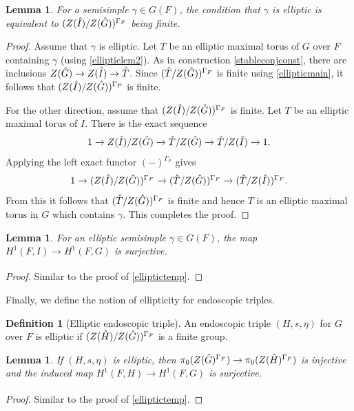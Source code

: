 \documentclass[11pt,a4paper]{article}
\theoremstyle{definition}
\newtheorem{D}[shared]{Definition}
\theoremstyle{plain}
\newtheorem{Le}[shared]{Lemma}
\theoremstyle{remark}
\theoremstyle{plain}
\begin{document}
\begin{Le}\label{ellipticlem3}
    For a semisimple $\gamma \in G(F)$, the condition that $\gamma$ is elliptic is equivalent to $(Z(\Hat{I})/Z(\Hat{G}))^{\Gamma_F}$ being finite.
\end{Le}
\begin{proof}
    Assume that $\gamma$ is elliptic. Let $T$ be an elliptic maximal torus of $G$ over $F$ containing $\gamma$ (using \ref{ellipticlem2}). As in construction \ref{stableconjconst}, there are inclusions $Z(\Hat{G}) \xrightarrow[]{} Z(\Hat{I}) \xrightarrow[]{} \Hat{T}$. Since $(\Hat{T}/Z(\Hat{G}))^{\Gamma_F}$ is finite using \ref{ellipticmain}, it follows that $(Z(\Hat{I})/Z(\Hat{G}))^{\Gamma_F}$ is finite.
    
    For the other direction, assume that $(Z(\Hat{I})/Z(\Hat{G}))^{\Gamma_F}$ is finite. Let $T$ be an elliptic maximal torus of $I$. There is the exact sequence
    $$ 1 \xrightarrow[]{} Z(\Hat{I})/Z(\Hat{G}) \xrightarrow{} \Hat{T}/Z(\Hat{G}) \xrightarrow[]{} \Hat{T} / Z(\Hat{I}) \xrightarrow[]{} 1. $$
    Applying the left exact functor $(-)^{\Gamma_F}$ gives
    $$ 1 \xrightarrow[]{} (Z(\Hat{I})/Z(\Hat{G}))^{\Gamma_F} \xrightarrow[]{} (\Hat{T}/Z(\Hat{G}))^{\Gamma_F} \xrightarrow[]{} (\Hat{T} / Z(\Hat{I}))^{\Gamma_F}.$$
    From this it follows that $(\Hat{T}/Z(\Hat{G}))^{\Gamma_F}$ is finite and hence $T$ is an elliptic maximal torus in $G$ which contains $\gamma$. This completes the proof.
\end{proof}

\begin{Le}
    For an elliptic semisimple $\gamma \in G(F)$, the map $H^1(F,I) \xrightarrow[]{} H^1(F,G)$ is surjective.
\end{Le}
\begin{proof}
    Similar to the proof of \ref{elliptictemp}.
\end{proof}

Finally, we define the notion of ellipticity for endoscopic triples.

\begin{D}[Elliptic endoscopic triple]
    An endoscopic triple $(H,s,\eta)$ for $G$ over $F$ is elliptic if $(Z(\Hat{H})/Z(\Hat{G}))^{\Gamma_F}$ is a finite group.
\end{D}

\begin{Le}
    If $(H,s,\eta)$ is elliptic, then $\pi_0(Z(\Hat{G})^{\Gamma_F}) \xrightarrow[]{} \pi_0(Z(\Hat{H})^{\Gamma_F})$ is injective and the induced map $H^1(F,H) \xrightarrow[]{} H^1(F,G)$ is surjective.
\end{Le}
\begin{proof}
    Similar to the proof of \ref{elliptictemp}.
\end{proof}
\end{document}
